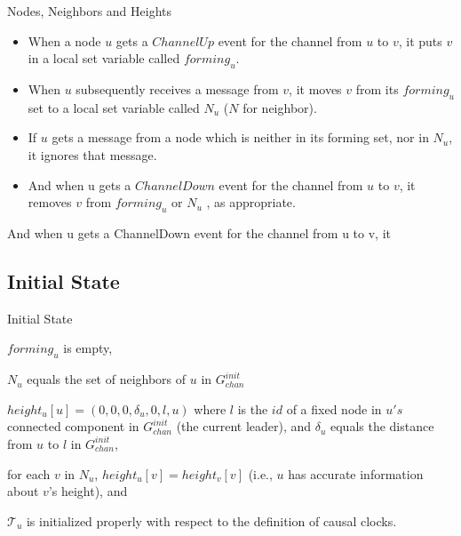 \documentclass{beamer}
\begin{document}
\begin{frame}{Nodes, Neighbors and Heights}
\begin{itemize}
	\item When a node $u$ gets a $ChannelUp$ event for the channel from $u$ to $v$, it puts $v$ in a local set variable called $forming_u$.
	\item When $u$ subsequently receives a message from $v$, it moves $v$ from its $forming_u$ set to a local set variable called $N_u$ ($N$ for neighbor).
	\item If $u$ gets a message from a node which is neither in its forming set, nor in $N_u$, it ignores that message.
	\item And when u gets a $ChannelDown$ event for the channel from $u$ to $v$, it removes $v$ from $forming_u$ or $N_u$ , as appropriate. 
\end{itemize}
   And when u gets a ChannelDown event for the channel from u to v, it
\end{frame}

\subsection{Initial State}
\begin{frame}{Initial State}
\begin{list}{--}
	\item $forming_u$ is empty,
	\item $N_u$ equals the set of neighbors of $u$ in $G^{init} _{chan}$
	\item $height_u[u] = (0, 0, 0, \delta _u , 0, l, u)$ where $l$ is the $id$ of a fixed node in $u's$ connected component in $G^{init} _{chan}$ (the current leader), and $\delta _u$ equals the distance from $u$ to $l$ in $G^{init} _{chan}$,
	\item for each $v$ in $N_u$, $height_u[v] = height_v[v]$ (i.e., $u$ has accurate information about $v$’s height), and
	\item $\mathcal{T} _u$ is initialized properly with respect to the definition of causal clocks.
\end{list}
\end{frame}
\end{document}
